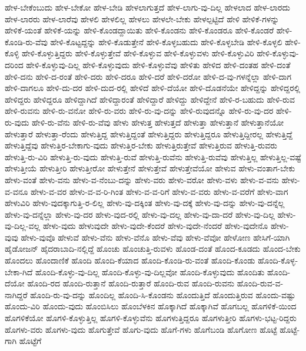 {ಹೇಳ-ಬೇಕೆಂಬುದು
ಹೇಳ-ಬೇಕೋ
ಹೇಳ-ಬೇಡಿ
ಹೇಳಲಾಗುತ್ತದೆ
ಹೇಳ-ಲಾಗು-ವು-ದಿಲ್ಲ
ಹೇಳಲಾದ
ಹೇಳ-ಲಾರದು
ಹೇಳ-ಲಾರರು
ಹೇಳ-ಲಾರೆವು
ಹೇಳಲಿ
ಹೇಳಲಿಲ್ಲ
ಹೇಳಲು
ಹೇಳಲೇ-ಬೇಕು
ಹೇಳಲ್ಪಟ್ಟಿದೆ
ಹೇಳಿ
ಹೇಳಿಕೆ-ಗಳನ್ನು
ಹೇಳಿಕೆ-ಯಂತೆ
ಹೇಳಿಕೆ-ಯನ್ನು
ಹೇಳಿ-ಕೊಂಡದ್ದಾಯಿತು
ಹೇಳಿ-ಕೊಂಡನು
ಹೇಳಿ-ಕೊಂಡರೂ
ಹೇಳಿ-ಕೊಂಡರೆ
ಹೇಳಿ-ಕೊಂಡಿ-ರು-ವೆವು
ಹೇಳಿ-ಕೊಟ್ಟದ್ದನ್ನು
ಹೇಳಿ-ಕೊಡುತ್ತೇನೆ
ಹೇಳಿ-ಕೊಳ್ಳಬಹುದು
ಹೇಳಿ-ಕೊಳ್ಳಬೇಡಿ
ಹೇಳಿ-ಕೊಳ್ಳಲಿ
ಹೇಳಿ-ಕೊಳ್ಳಿ
ಹೇಳಿ-ಕೊಳ್ಳುತ್ತಿದ್ದರು
ಹೇಳಿ-ಕೊಳ್ಳುತ್ತೇವೆ
ಹೇಳಿ-ಕೊಳ್ಳುವ
ಹೇಳಿ-ಕೊಳ್ಳುವಳು
ಹೇಳಿ-ಕೊಳ್ಳುವಿರಿ
ಹೇಳಿ-ಕೊಳ್ಳುವು-ದರಿಂದ
ಹೇಳಿ-ಕೊಳ್ಳುವು-ದಿಲ್ಲ
ಹೇಳಿ-ಕೊಳ್ಳುವುದು
ಹೇಳಿ-ಕೊಳ್ಳುವೆವು
ಹೇಳಿತು
ಹೇಳಿದ
ಹೇಳಿ-ದಂತಹ
ಹೇಳಿ-ದಂತೆ
ಹೇಳಿ-ದನು
ಹೇಳಿ-ದ-ರಂತೆ
ಹೇಳಿ-ದರು
ಹೇಳಿ-ದರೂ
ಹೇಳಿ-ದರೆ
ಹೇಳಿ-ದರೋ
ಹೇಳಿ-ದ-ವು-ಗಳನ್ನೆಲ್ಲಾ
ಹೇಳಿ-ದಾಗ
ಹೇಳಿ-ದಾಗಲೂ
ಹೇಳಿ-ದು-ದರ
ಹೇಳಿ-ದುದ-ರಲ್ಲಿ
ಹೇಳಿದೆ
ಹೇಳಿ-ದೆಯೋ
ಹೇಳಿ-ದೊಡನೆಯೇ
ಹೇಳಿದ್ದನ್ನು
ಹೇಳಿದ್ದರಲ್ಲಿ
ಹೇಳಿದ್ದರು
ಹೇಳಿದ್ದರೂ
ಹೇಳಿದ್ದಾಗಿದೆ
ಹೇಳಿದ್ದಾರಂತೆ
ಹೇಳಿದ್ದಾರೆ
ಹೇಳಿದ್ದು
ಹೇಳಿದ್ದೇನೆ
ಹೇಳಿ-ರ-ಬಹುದು
ಹೇಳಿ-ರುವ
ಹೇಳಿ-ರುವನು
ಹೇಳಿ-ರು-ವನೋ
ಹೇಳಿ-ರು-ವರು
ಹೇಳಿ-ರು-ವು-ದನ್ನು
ಹೇಳಿ-ರುವುದನ್ನೊ
ಹೇಳಿ-ರು-ವು-ದರ
ಹೇಳಿ-ರು-ವುದು
ಹೇಳಿ-ರು-ವೆನು
ಹೇಳಿ-ರು-ವೆವು
ಹೇಳು
ಹೇಳುತ್ತ
ಹೇಳುತ್ತದೆ
ಹೇಳುತ್ತಾ
ಹೇಳುತ್ತಾನೆ
ಹೇಳುತ್ತಾನೆಯೋ
ಹೇಳುತ್ತಾರೆ
ಹೇಳುತ್ತಾ-ರೆಂದು
ಹೇಳುತ್ತಿದ್ದ
ಹೇಳುತ್ತಿದ್ದಂತೆ
ಹೇಳುತ್ತಿದ್ದರು
ಹೇಳುತ್ತಿದ್ದರೂ
ಹೇಳುತ್ತಿದ್ದೀರಲ್ಲ
ಹೇಳುತ್ತಿದ್ದೆ
ಹೇಳುತ್ತಿದ್ದೆವು
ಹೇಳುತ್ತಿರ-ಬೇಕಾಗು-ವುದು
ಹೇಳುತ್ತಿರ-ಬೇಕು
ಹೇಳುತ್ತಿರುತ್ತೇವೆ
ಹೇಳುತ್ತಿರುವ
ಹೇಳುತ್ತಿ-ರುವರು
ಹೇಳುತ್ತಿ-ರು-ವಿರಿ
ಹೇಳುತ್ತಿ-ರು-ವುದು
ಹೇಳುತ್ತಿ-ರುವೆ
ಹೇಳುತ್ತಿ-ರುವೆನು
ಹೇಳುತ್ತಿ-ರುವೆವು
ಹೇಳುತ್ತಿಲ್ಲ
ಹೇಳುತ್ತಿಲ್ಲ-ವಷ್ಟೆ
ಹೇಳುತ್ತೀಯೆ
ಹೇಳುತ್ತೀರಿ
ಹೇಳುತ್ತೀರೋ
ಹೇಳುತ್ತೇನೆ
ಹೇಳುತ್ತೇವೆ
ಹೇಳುತ್ತೇವೆಯೋ
ಹೇಳುವ
ಹೇಳು-ವಂತಾಗ-ಬೇಕು
ಹೇಳು-ವಂತೆ
ಹೇಳು-ವನು
ಹೇಳು-ವ-ನೆಂಬು-ದನ್ನು
ಹೇಳು-ವರು
ಹೇಳು-ವರೋ
ಹೇಳು-ವಳು
ಹೇಳು-ವ-ವನು
ಹೇಳು-ವ-ವನೂ
ಹೇಳು-ವ-ವರ
ಹೇಳು-ವ-ವ-ರಿ-ಗಿಂತ
ಹೇಳು-ವ-ವ-ರಿಗೆ
ಹೇಳು-ವ-ವರು
ಹೇಳು-ವ-ವರೆಗೆ
ಹೇಳು-ವಾಗ
ಹೇಳುವಿರಿ
ಹೇಳು-ವುದಕ್ಕಾಗುತ್ತಿ-ರ-ಲಿಲ್ಲ
ಹೇಳು-ವು-ದಕ್ಕಿಂತ
ಹೇಳು-ವು-ದಕ್ಕೆ
ಹೇಳು-ವು-ದನ್ನು
ಹೇಳು-ವು-ದನ್ನೆಲ್ಲ
ಹೇಳು-ವು-ದನ್ನೆಲ್ಲಾ
ಹೇಳು-ವು-ದರ
ಹೇಳು-ವುದ-ರಲ್ಲಿ
ಹೇಳು-ವು-ದಲ್ಲ
ಹೇಳು-ವು-ದಾ-ದರೆ
ಹೇಳು-ವು-ದಿಲ್ಲ
ಹೇಳು-ವು-ದಿಲ್ಲ-ವಲ್ಲ
ಹೇಳು-ವುದು
ಹೇಳುವುದೇ
ಹೇಳು-ವುದೇ-ಕೆಂದರೆ
ಹೇಳು-ವುದೇ-ನೆಂದರೆ
ಹೇಳು-ವುದೇನೊ
ಹೇಳು-ವುವು
ಹೇಳು-ವುವೊ
ಹೇಳುವೆ
ಹೇಳು-ವೆನು
ಹೇಳು-ವೆನೊ
ಹೇಳು-ವೆವು
ಹೇಳು-ವೆವೋ
ಹೇಳೋಣ
ಹೇಸಿಗೆ-ಯಾಗಿ
ಹೈಡೋಜನ್
ಹೈದರಾಬಾದಿ-ನಲ್ಲಿದ್ದೆ
ಹೊಂಚು
ಹೊಂಚುತ್ತಿ-ರುವಳು
ಹೊಂಡ-ದಂತೆ
ಹೊಂದ-ಕೂಡದು
ಹೊಂದ-ಬೇಕು
ಹೊಂದಲು
ಹೊಂದಾಣಿಕೆ
ಹೊಂದಿ
ಹೊಂದಿ-ಕೆಯಾದ
ಹೊಂದಿ-ಕೊಂಡಿ-ರು-ವಂತೆ
ಹೊಂದಿ-ಕೊಂಡು
ಹೊಂದಿ-ಕೊಳ್ಳ-ಬೇಕಾ-ಗಿದೆ
ಹೊಂದಿ-ಕೊಳ್ಳು-ವು-ದಿಲ್ಲ
ಹೊಂದಿ-ಕೊಳ್ಳು-ವು-ದಿಲ್ಲವೋ
ಹೊಂದಿ-ಕೊಳ್ಳುವುದು
ಹೊಂದಿತು
ಹೊಂದಿ-ದೆಯೋ
ಹೊಂದಿ-ರದ
ಹೊಂದಿ-ರುತ್ತಾನೆ
ಹೊಂದಿ-ರುತ್ತಾರೆ
ಹೊಂದಿ-ರುವ
ಹೊಂದಿ-ರುವನು
ಹೊಂದಿ-ರುವ-ವ-ನಾಗಿದ್ದರೆ
ಹೊಂದಿ-ರು-ವು-ದನ್ನು
ಹೊಂದಿಲ್ಲ
ಹೊಂದಿ-ಸಿ-ಕೊಂಡನು
ಹೊಂದುತ್ತಿದೆ
ಹೊಂದುತ್ತಿರುವ
ಹೊಂದು-ವಷ್ಟು
ಹೊಂದು-ವಿರಿ
ಹೊಂದು-ವುದು
ಹೊಂಬಿಸಿಲು
ಹೊಂಬೆಳಕಿನ
ಹೊಕ್ಕಾಗಿದೆ
ಹೊಕ್ಕಾಗಿವೆ
ಹೊಗಬಲ್ಲ
ಹೊಗಳಿಕೆ-ಯಿಂದ
ಹೊಗಳಿಕೆಯೋ
ಹೊಗಳಿ-ಕೊಳ್ಳುತ್ತಿಲ್ಲ
ಹೊಗಳಿ-ಕೊಳ್ಳುವೆನು
ಹೊಗಳುತ್ತಿದ್ದರೂ
ಹೊಗಳುತ್ತೀರಿ
ಹೊಗಳು-ಭಟ್ಟ-ರಿದ್ದರು
ಹೊಗಳು-ವರು
ಹೊಗಳು-ವುದು
ಹೊಗುತ್ತೇವೆ
ಹೊಗು-ವುದು
ಹೊಗೆ-ಗಳು
ಹೊಗೆಬಂಡಿ
ಹೊಗೋಣ
ಹೊಟ್ಟೆ
ಹೊಟ್ಟೆ-ಗಾಗಿ
ಹೊಟ್ಟೆಗೆ
}
